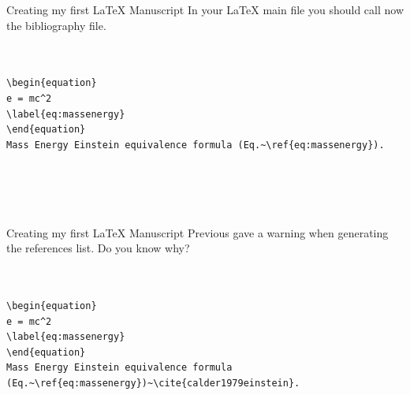 \begin{frame}[fragile]{Creating my first \LaTeX{} Manuscript}
In your \LaTeX{} main file you should call now the bibliography file.
\scriptsize
\begin{verbatim}


\begin{equation}
e = mc^2
\label{eq:massenergy}
\end{equation}
Mass Energy Einstein equivalence formula (Eq.~\ref{eq:massenergy}).





\end{verbatim}
\end{frame}

\begin{frame}[fragile]{Creating my first \LaTeX{} Manuscript}
Previous gave a warning when generating the references list. Do you know why?
\pause
\scriptsize
\begin{verbatim}


\begin{equation}
e = mc^2
\label{eq:massenergy}
\end{equation}
Mass Energy Einstein equivalence formula 
(Eq.~\ref{eq:massenergy})~\cite{calder1979einstein}.





\end{verbatim}
\end{frame}




